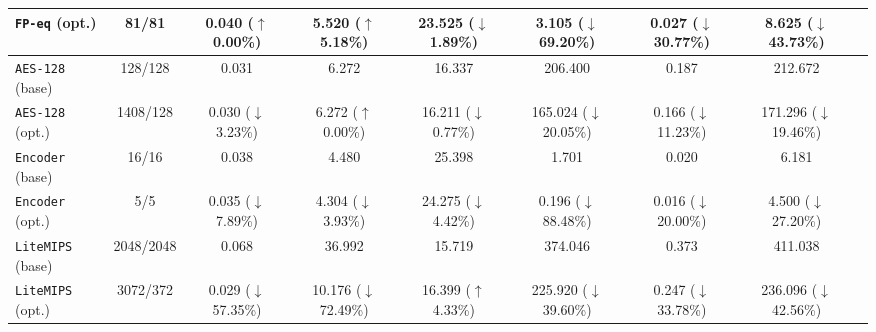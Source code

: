 \begin{tabular}{lcccccccc}
    \texttt{FP-eq} (opt.) & 81/81 & 0.040 ($\uparrow$ 0.00\%) & 5.520 ($\uparrow$ 5.18\%) & 23.525 ($\downarrow$ 1.89\%) & 3.105 ($\downarrow$ 69.20\%) & 0.027 ($\downarrow$ 30.77\%) & 8.625 ($\downarrow$ 43.73\%) \\
    \midrule
    \texttt{AES-128} (base) & 128/128 & 0.031 & 6.272 & 16.337 & 206.400 & 0.187 & 212.672 \\
    \texttt{AES-128} (opt.) & 1408/128 & 0.030 ($\downarrow$ 3.23\%) & 6.272 ($\uparrow$ 0.00\%) & 16.211 ($\downarrow$ 0.77\%) & 165.024 ($\downarrow$ 20.05\%) & 0.166 ($\downarrow$ 11.23\%) & 171.296 ($\downarrow$ 19.46\%) \\
    \midrule
    \texttt{Encoder} (base) & 16/16 & 0.038 & 4.480 & 25.398 & 1.701 & 0.020 & 6.181 \\
    \texttt{Encoder} (opt.) & 5/5 & 0.035 ($\downarrow$ 7.89\%) & 4.304 ($\downarrow$ 3.93\%) & 24.275 ($\downarrow$ 4.42\%) & 0.196 ($\downarrow$ 88.48\%) & 0.016 ($\downarrow$ 20.00\%) & 4.500 ($\downarrow$ 27.20\%) \\
    \midrule
    \texttt{LiteMIPS} (base) & 2048/2048 & 0.068 & 36.992 & 15.719 & 374.046 & 0.373 & 411.038 \\
    \texttt{LiteMIPS} (opt.) & 3072/372 & 0.029 ($\downarrow$ 57.35\%) & 10.176 ($\downarrow$ 72.49\%) & 16.399 ($\uparrow$ 4.33\%) & 225.920 ($\downarrow$ 39.60\%) & 0.247 ($\downarrow$ 33.78\%) & 236.096 ($\downarrow$ 42.56\%) \\
    \bottomrule[1.2pt]
\end{tabular}
